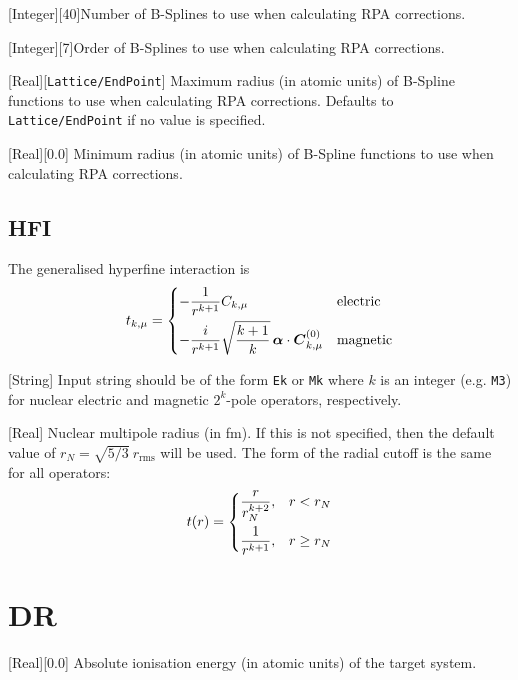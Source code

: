 \documentclass{report}
\begin{document}
[Integer][40]{Number of B-Splines to use when calculating RPA corrections.}

[Integer][7]{Order of B-Splines to use when calculating RPA corrections.}

[Real][\texttt{Lattice/EndPoint}]{%
Maximum radius (in atomic units) of B-Spline functions to use when calculating RPA corrections.
Defaults to \texttt{Lattice/EndPoint} if no value is specified.%
}

[Real][0.0]{%
Minimum radius (in atomic units) of B-Spline functions to use when calculating RPA corrections.%
}

\subsection{HFI}
\label{sec:HFI}

The generalised hyperfine interaction is
\[
t_{k,\mu} = \begin{dcases}
-\frac{1}{r^{k+1}}C_{k,\mu} & \textrm{electric} \\
-\frac{i}{r^{k+1}}\sqrt{\frac{k+1}{k}}\, \boldsymbol{\alpha}\cdot\boldsymbol{C}^{(0)}_{k,\mu} & \textrm{magnetic}
\end{dcases}
\]

[String]{%
Input string should be of the form \texttt{Ek} or \texttt{Mk} where $k$ is an integer (e.g. \texttt{M3}) for nuclear electric and magnetic $2^k$-pole operators, respectively.%
}

[Real]{%
Nuclear multipole radius (in fm). If this is not specified, then the default value of $r_N = \sqrt{5/3} ~ r_{\textrm{rms}}$ will be used. The form of the radial cutoff is the same for all operators:
\[
t(r) = \begin{dcases}
\frac{r}{r_N^{k+2}}, & r < r_N \\
\frac{1}{r^{k+1}}, & r \geq r_N \\
\end{dcases}
\]%
}

\section{DR} %

[Real][0.0]{%
Absolute ionisation energy (in atomic units) of the target system.%
}
\end{document}
